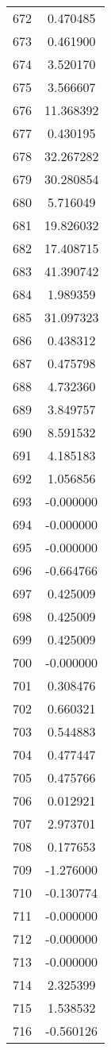 \documentclass[12pt]{article}
\begin{document}
\begin{longtable}{@{}cc@{}}
672 & 0.470485 \\
673 & 0.461900 \\
674 & 3.520170 \\
675 & 3.566607 \\
676 & 11.368392 \\
677 & 0.430195 \\
678 & 32.267282 \\
679 & 30.280854 \\
680 & 5.716049 \\
681 & 19.826032 \\
682 & 17.408715 \\
683 & 41.390742 \\
684 & 1.989359 \\
685 & 31.097323 \\
686 & 0.438312 \\
687 & 0.475798 \\
688 & 4.732360 \\
689 & 3.849757 \\
690 & 8.591532 \\
691 & 4.185183 \\
692 & 1.056856 \\
693 & -0.000000 \\
694 & -0.000000 \\
695 & -0.000000 \\
696 & -0.664766 \\
697 & 0.425009 \\
698 & 0.425009 \\
699 & 0.425009 \\
700 & -0.000000 \\
701 & 0.308476 \\
702 & 0.660321 \\
703 & 0.544883 \\
704 & 0.477447 \\
705 & 0.475766 \\
706 & 0.012921 \\
707 & 2.973701 \\
708 & 0.177653 \\
709 & -1.276000 \\
710 & -0.130774 \\
711 & -0.000000 \\
712 & -0.000000 \\
713 & -0.000000 \\
714 & 2.325399 \\
715 & 1.538532 \\
716 & -0.560126 \\

\end{longtable}
\end{document}

